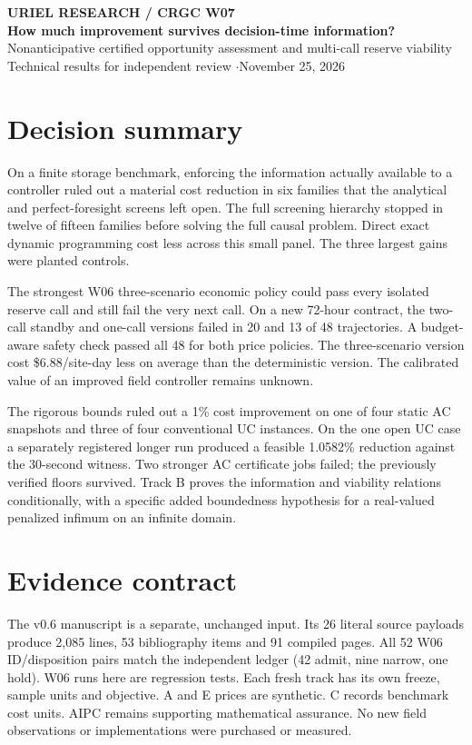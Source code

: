 \documentclass[11pt,letterpaper]{article}
\begin{document}
{\small\bfseries URIEL RESEARCH \quad / \quad CRGC W07}\\[8pt]
{\huge\bfseries How much improvement survives decision-time information?}\\[7pt]
{\large Nonanticipative certified opportunity assessment and multi-call reserve viability}\\[5pt]
{\small Technical results for independent review \enspace$\cdot$\enspace November 25, 2026}

\section*{Decision summary}
On a finite storage benchmark, enforcing the information actually available to a controller ruled out a material cost reduction in six families that the analytical and perfect-foresight screens left open. The full screening hierarchy stopped in twelve of fifteen families before solving the full causal problem. Direct exact dynamic programming cost less across this small panel. The three largest gains were planted controls.

The strongest W06 three-scenario economic policy could pass every isolated reserve call and still fail the very next call. On a new 72-hour contract, the two-call standby and one-call versions failed in 20 and 13 of 48 trajectories. A budget-aware safety check passed all 48 for both price policies. The three-scenario version cost \$6.88/site-day less on average than the deterministic version. The calibrated value of an improved field controller remains unknown.

The rigorous bounds ruled out a 1\% cost improvement on one of four static AC snapshots and three of four conventional UC instances. On the one open UC case a separately registered longer run produced a feasible 1.0582\% reduction against the 30-second witness. Two stronger AC certificate jobs failed; the previously verified floors survived. Track B proves the information and viability relations conditionally, with a specific added boundedness hypothesis for a real-valued penalized infimum on an infinite domain.

\section*{Evidence contract}
The v0.6 manuscript is a separate, unchanged input. Its 26 literal source payloads produce 2,085 lines, 53 bibliography items and 91 compiled pages. All 52 W06 ID/disposition pairs match the independent ledger (42 admit, nine narrow, one hold). W06 runs here are regression tests. Each fresh track has its own freeze, sample units and objective. A and E prices are synthetic. C records benchmark cost units. AIPC remains supporting mathematical assurance. No new field observations or implementations were purchased or measured.
\end{document}
